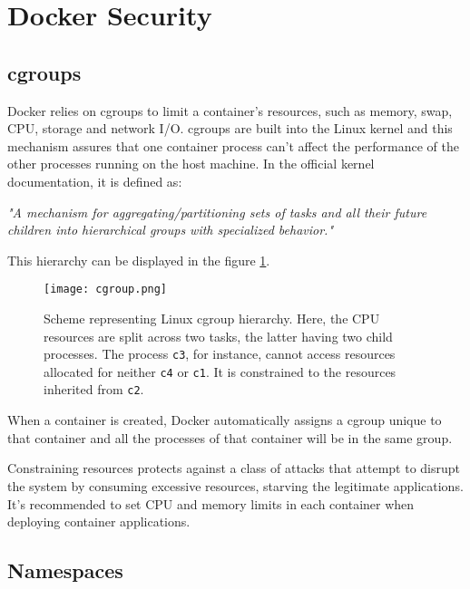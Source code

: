 
\section{Docker Security}
\label{sec::security}

\subsection{cgroups}
\label{ssec::security:cgroups}

Docker relies on cgroups to limit a container's resources, such as memory, swap, \acs{CPU}, storage and network I/O. cgroups are built into the Linux kernel and this mechanism assures that one container process can't affect the performance of the other processes running on the host machine. In the official kernel documentation\cite{cgroup-man}, it is defined as:
\begin{displayquote}
    \textit{"A mechanism for aggregating/partitioning sets of tasks and all their future children into hierarchical groups with specialized behavior."}
\end{displayquote}
This hierarchy can be displayed in the figure \ref{fig:cgroup-hch}.

\begin{figure}[!htb]
    \centering
    \texttt{[image: cgroup.png]}
    \caption{Scheme representing Linux cgroup hierarchy\cite{fig-src:cgroups}. Here, the \acs{CPU} resources are split across two tasks, the latter having two child processes. The process \texttt{c3}, for instance, cannot access resources allocated for neither \texttt{c4} or \texttt{c1}. It is constrained to the resources inherited from \texttt{c2}.}
    \label{fig:cgroup-hch}
\end{figure}

When a container is created, Docker automatically assigns a cgroup unique to that container and all the processes of that container will be in the same group\cite{docker-cgroups}.

Constraining resources protects against a class of attacks that attempt to disrupt the system by consuming excessive resources, starving the legitimate applications. It's recommended to set CPU and memory limits in each container when deploying container applications\cite{Rice2020-kl}.


\subsection{Namespaces}
\label{ssec::security:namespaces}

